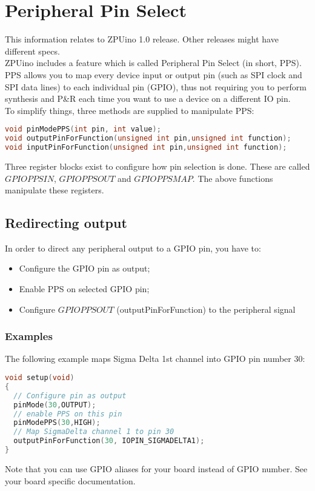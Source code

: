 
\chapter{Peripheral Pin Select}
This information relates to ZPUino 1.0 release. Other releases might have different specs. \\


ZPUino includes a feature which is called Peripheral Pin Select (in short, PPS). 
PPS allows you to map every device input or output pin (such as SPI clock and SPI data lines) to 
each individual pin (GPIO), thus not requiring you to perform synthesis and P\&R each time you want to use
a device on a different IO pin. \\
To simplify things, three methods are supplied to manipulate PPS:

\begin{lstlisting}[language=C++]
void pinModePPS(int pin, int value);
void outputPinForFunction(unsigned int pin,unsigned int function);
void inputPinForFunction(unsigned int pin,unsigned int function);
\end{lstlisting}

Three register blocks exist to configure how pin selection is done. These are called $GPIOPPSIN$,
$GPIOPPSOUT$ and $GPIOPPSMAP$. The above functions manipulate these registers.


\section{Redirecting output}
In order to direct any peripheral output to a GPIO pin, you have to:

\begin{itemize}
\item Configure the GPIO pin as output;
\item Enable PPS on selected GPIO pin;
\item Configure $GPIOPPSOUT$ (outputPinForFunction) to the peripheral signal
\end{itemize}

\subsection{Examples}
The following example maps Sigma Delta 1st channel into GPIO pin number 30:

\begin{lstlisting}[language=C++]
void setup(void)
{
  // Configure pin as output
  pinMode(30,OUTPUT); 
  // enable PPS on this pin
  pinModePPS(30,HIGH); 
  // Map SigmaDelta channel 1 to pin 30
  outputPinForFunction(30, IOPIN_SIGMADELTA1); 
}
\end{lstlisting}
Note that you can use GPIO aliases for your board instead of GPIO number. See your board specific documentation.

